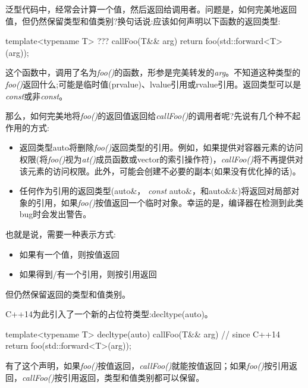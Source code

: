 泛型代码中，经常会计算一个值，然后返回给调用者。问题是，如何完美地返回值，但仍然保留类型和值类别?换句话说:应该如何声明以下函数的返回类型:

\begin{cppcode}
template<typename T>
??? callFoo(T&& arg)
{
	return foo(std::forward<T>(arg));
}
\end{cppcode}

这个函数中，调用了名为\textit{foo()}的函数，形参是完美转发的\textit{arg}。不知道这种类型的\textit{foo()}返回什么;可能是临时值(prvalue)、lvalue引用或rvalue引用。返回类型可以是\textit{const}或非\textit{const}。

那么，如何完美地将\textit{foo()}的返回值返回给\textit{callFoo()}的调用者呢?先说有几个种不起作用的方式:

\begin{itemize}
	\item 返回类型auto将删除\textit{foo()}返回类型的引用。例如，如果提供对容器元素的访问权限(将\textit{foo()}视为\textit{at()}成员函数或vector的索引操作符)，\textit{callFoo()}将不再提供对该元素的访问权限。此外，可能会创建不必要的副本(如果没有优化掉的话)。
	\item 任何作为引用的返回类型(auto\&， \textit{const} auto\&，和auto\&\&)将返回对局部对象的引用，如果\textit{foo()}按值返回一个临时对象。幸运的是，编译器在检测到此类bug时会发出警告。
\end{itemize}

也就是说，需要一种表示方式:

\begin{itemize}
	\item 如果有一个值，则按值返回
	\item 如果得到/有一个引用，则按引用返回
\end{itemize}

但仍然保留返回的类型和值类别。

C++14为此引入了一个新的占位符类型:decltype(auto)。

\begin{cppcode}
template<typename T>
decltype(auto) callFoo(T&& arg) // since C++14
{
	return foo(std::forward<T>(arg));
}
\end{cppcode}

有了这个声明，如果\textit{foo()}按值返回，\textit{callFoo()}就能按值返回；如果\textit{foo()}按引用返回，\textit{callFoo()}按引用返回，类型和值类别都可以保留。












































